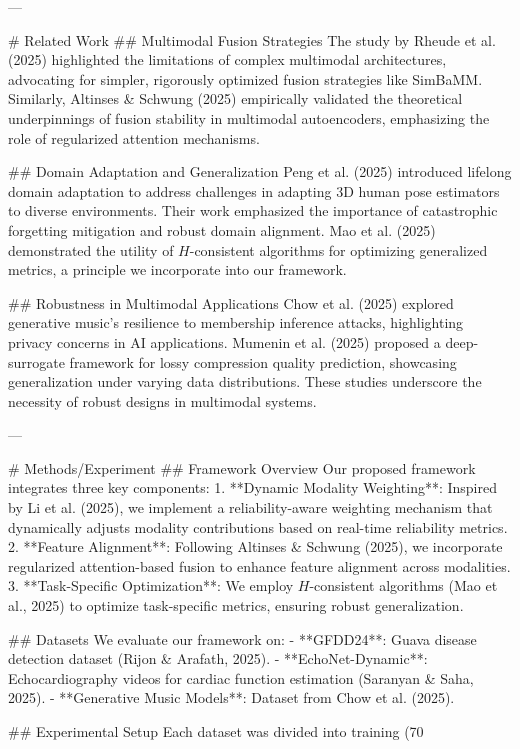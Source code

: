 ---

# Related Work
## Multimodal Fusion Strategies
The study by Rheude et al. (2025) highlighted the limitations of complex multimodal architectures, advocating for simpler, rigorously optimized fusion strategies like SimBaMM. Similarly, Altinses & Schwung (2025) empirically validated the theoretical underpinnings of fusion stability in multimodal autoencoders, emphasizing the role of regularized attention mechanisms.

## Domain Adaptation and Generalization
Peng et al. (2025) introduced lifelong domain adaptation to address challenges in adapting 3D human pose estimators to diverse environments. Their work emphasized the importance of catastrophic forgetting mitigation and robust domain alignment. Mao et al. (2025) demonstrated the utility of $H$-consistent algorithms for optimizing generalized metrics, a principle we incorporate into our framework.

## Robustness in Multimodal Applications
Chow et al. (2025) explored generative music's resilience to membership inference attacks, highlighting privacy concerns in AI applications. Mumenin et al. (2025) proposed a deep-surrogate framework for lossy compression quality prediction, showcasing generalization under varying data distributions. These studies underscore the necessity of robust designs in multimodal systems.

---

# Methods/Experiment
## Framework Overview
Our proposed framework integrates three key components:
1. **Dynamic Modality Weighting**: Inspired by Li et al. (2025), we implement a reliability-aware weighting mechanism that dynamically adjusts modality contributions based on real-time reliability metrics.
2. **Feature Alignment**: Following Altinses & Schwung (2025), we incorporate regularized attention-based fusion to enhance feature alignment across modalities.
3. **Task-Specific Optimization**: We employ $H$-consistent algorithms (Mao et al., 2025) to optimize task-specific metrics, ensuring robust generalization.

## Datasets
We evaluate our framework on:
- **GFDD24**: Guava disease detection dataset (Rijon & Arafath, 2025).
- **EchoNet-Dynamic**: Echocardiography videos for cardiac function estimation (Saranyan & Saha, 2025).
- **Generative Music Models**: Dataset from Chow et al. (2025).

## Experimental Setup
Each dataset was divided into training (70%

